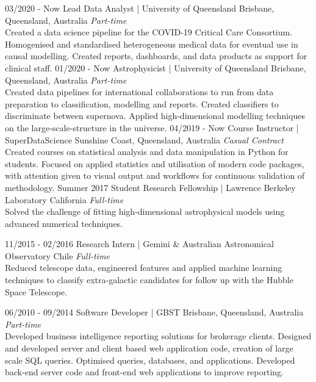 \documentclass[11pt]{friggeri-cv}
\begin{document}
\begin{entrylist}
\entry
{03/2020 - Now}
{Lead Data Analyst | University of Queensland}
{Brisbane, Queensland, Australia}
{\emph{Part-time} \\
Created a data science pipeline for the COVID-19 Critical Care Consortium. Homogenised and standardised heterogeneous medical data for eventual use in causal modelling. Created reports, dashboards, and data products as support for clinical staff.}
\entry
{01/2020 - Now}
{Astrophysicist | University of Queensland}
{Brisbane, Queensland, Australia}
{\emph{Part-time} \\
Created data pipelines for international collaborations to run from data preparation to classification, modelling and reports. Created classifiers to discriminate between supernova. Applied high-dimensional modelling techniques on the large-scale-structure in the universe.}
\entry
{04/2019 - Now}
{Course Instructor | SuperDataScience}
{Sunshine Coast, Queensland, Australia}
{\emph{Casual Contract} \\
Created courses on statistical analysis and data manipulation in Python for students. Focused on applied statistics and utilisation of modern code packages, with attention given to visual output and workflows for continuous validation of methodology.}
\entry
{Summer 2017}
{Student Research Fellowship | Lawrence Berkeley Laboratory}
{ California}
{ \emph{Full-time} \\
Solved the challenge of fitting high-dimensional astrophysical models using advanced numerical techniques.}
\end{entrylist}
\begin{entrylist}
\entry
{11/2015 - 02/2016}
{Research Intern | Gemini \& Australian Astronomical Observatory}
{Chile}
{\emph{Full-time} \\
Reduced telescope data, engineered features and applied machine learning techniques to classify extra-galactic candidates for follow up with the Hubble Space Telescope.}
\end{entrylist}
\begin{entrylist}
\entry
{06/2010 - 09/2014}
{Software Developer | GBST}
{Brisbane, Queensland, Australia}
{\emph{Part-time} \\
Developed business intelligence reporting solutions for brokerage clients. Designed and developed server and client based web application code, creation of large scale SQL queries. Optimised queries, databases, and applications. Developed back-end server code and front-end web applications to improve reporting.}

\end{entrylist}
\end{document}
